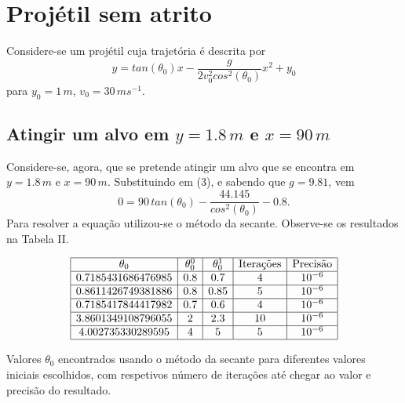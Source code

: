 \documentclass[aps,pre,twocolumn,showpacs,amsmath,amssymb]{revtex4-1}
\begin{document}
\section{Projétil sem atrito}
Considere-se um projétil cuja trajetória é descrita por
\begin{equation}
  y=tan(\theta_{0})x-\frac{g}{2v_{0}^{2}cos^2(\theta_{0})}x^2 + y_0
\end{equation}
para $y_0=1\,m$, $v_0=30\,ms^{-1}$.\\
\subsection{Atingir um alvo em $y=1.8\,m$ e $x=90\,m$}
Considere-se, agora, que se pretende atingir um alvo que se encontra em $y=1.8\,m$ e $x=90\,m$. Substituindo em (3), e sabendo que $g=9.81$, vem
\begin{equation}
  0=90\,tan(\theta_0)- \frac{44.145}{cos^2(\theta_0)}-0.8.
\end{equation}
Para resolver a equação utilizou-se o método da secante. Observe-se os resultados na Tabela II.
\begin{table} [h]
  $$\begin{array}{|c|c|c|c|c|} \hline
  \theta_0 & \theta_0^0 & \theta_0^1 & \text{Iterações} & \text{Precisão} \\ \hline
  0.7185431686476985 & 0.8 & 0.7 & 4 & 10^{-6} \\ \hline
  0.8611426749381886 & 0.8 & 0.85 & 5 & 10^{-6} \\ \hline
  0.7185417844417982 & 0.7 & 0.6 & 4 & 10^{-6} \\ \hline
  3.8601349108796055 & 2 & 2.3 & 10 & 10^{-6} \\ \hline
  4.002735330289595 & 4 & 5 & 5 & 10^{-6} \\ \hline
\end{array}$$
  \caption{Valores $\theta_0$ encontrados usando o método da secante para diferentes valores iniciais escolhidos, com respetivos número de iterações até chegar ao valor e precisão do resultado.}
\end{table}
\end{document}
